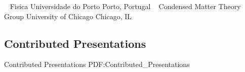 \newline
~
\Gap
{}
Fisica
\newline
    Universidade do Porto
    \newline
Porto, Portugal
\newline
~
\Gap
{}
Condensed Matter Theory Group
\newline
    University of Chicago
    \newline
Chicago, IL
\newline
~
\Gap
\vspace*{0.2cm}\subsection
{Contributed Presentations}
{Contributed Presentations}
{PDF:Contributed_Presentations}

